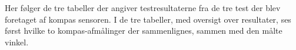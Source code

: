 Her følger de tre tabeller der angiver testresultaterne fra de tre test der blev foretaget af kompas sensoren.
I de tre tabeller, med oversigt over resultater, ses først hvilke to kompas-afmålinger der sammenlignes, sammen med den målte vinkel.



